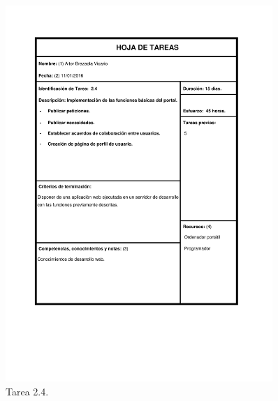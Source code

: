 \documentclass{DeustoFDP}
\begin{document}
\begin{figure}[H]
    \centering
    \includegraphics[width=0.9\textwidth]{fig/Tareas/24}
    \caption{Tarea 2.4.}
    \label{fig:t24}
\end{figure}
\end{document}
